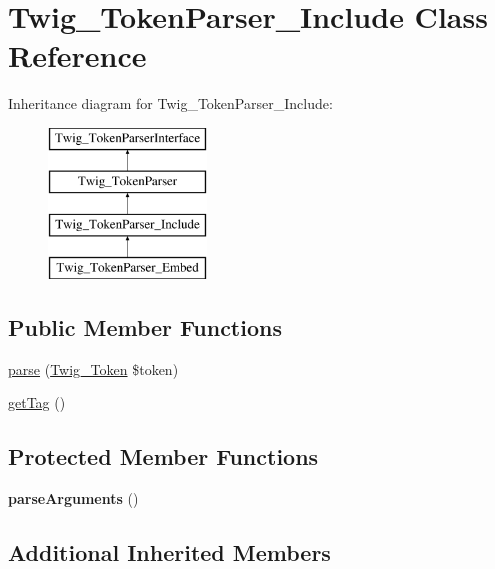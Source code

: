 \hypertarget{classTwig__TokenParser__Include}{}\section{Twig\+\_\+\+Token\+Parser\+\_\+\+Include Class Reference}
\label{classTwig__TokenParser__Include}
Inheritance diagram for Twig\+\_\+\+Token\+Parser\+\_\+\+Include\+:\begin{figure}[H]
\begin{center}
\leavevmode
\includegraphics[height=4.000000cm]{classTwig__TokenParser__Include}
\end{center}
\end{figure}
\subsection*{Public Member Functions}
\begin{DoxyCompactItemize}
\item 
\hyperlink{classTwig__TokenParser__Include_ada8b4cc94ac46363ecb4879ac499d0ff}{parse} (\hyperlink{classTwig__Token}{Twig\+\_\+\+Token} \$token)
\item 
\hyperlink{classTwig__TokenParser__Include_a40d8f1b62f883a7c7e3904ec8a883aa5}{get\+Tag} ()
\end{DoxyCompactItemize}
\subsection*{Protected Member Functions}
\begin{DoxyCompactItemize}
\item 
{\bfseries parse\+Arguments} ()\hypertarget{classTwig__TokenParser__Include_a02064a26573b4a2f89eaf575b29935da}{}\label{classTwig__TokenParser__Include_a02064a26573b4a2f89eaf575b29935da}

\end{DoxyCompactItemize}
\subsection*{Additional Inherited Members}


